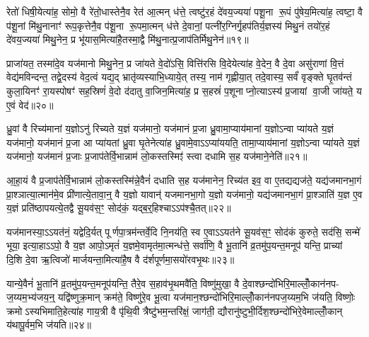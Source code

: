 रेतो॑ धिषी॒येत्या॑ह॒ सोमो॒ वै रे॑तो॒धास्तेनै॒व रेत॑ आ॒त्मन् ध॑त्ते॒ त्वष्टु॑र॒हं दे॑वय॒ज्यया॑ पशू॒ना रू॒पं पु॑षेय॒मित्या॑ह॒ त्वष्टा॒ वै प॑शू॒नां मि॑थु॒नानाꣳ॑ रूप॒कृत्तेनै॒व प॑शू॒ना रू॒पमा॒त्मन् ध॑त्ते दे॒वानां॒ पत्नी॑र॒ग्निर्गृ॒हप॑तिर्य॒ज्ञस्य॑ मिथु॒नं तयो॑र॒हं दे॑वय॒ज्यया॑ मिथु॒नेन॒ प्र भू॑यास॒मित्या॑है॒तस्मा॒द्वै मि॑थु॒नात्प्र॒जाप॑तिर्मिथु॒नेन॑॥१९॥

प्राजा॑यत॒ तस्मा॑दे॒व यज॑मानो मिथु॒नेन॒ प्र जा॑यते वे॒दो॑ऽसि॒ वित्ति॑रसि वि॒देयेत्या॑ह वे॒देन॒ वै दे॒वा असु॑राणां वि॒त्तं वेद्य॑मविन्दन्त॒ तद्वे॒दस्य॑ वेद॒त्वं यद्य॒द् भ्रातृ॑व्यस्याभि॒ध्याये॒त् तस्य॒ नाम॑ गृह्णीया॒त् तदे॒वास्य॒ सर्वं॑ वृङ्क्ते घृ॒तव॑न्तं कुला॒यिनꣳ॑ रा॒यस्पोषꣳ॑ सह॒स्रिणं॑ वे॒दो द॑दातु वा॒जिन॒मित्या॑ह॒ प्र स॒हस्रं॑ प॒शूनाप्नो॒त्याऽस्य॑ प्र॒जायां वा॒जी जा॑यते॒ य ए॒वं वेद॑॥२०॥

{}

ध्रु॒वां वै रिच्य॑मानां य॒ज्ञोऽनु॑ रिच्यते य॒ज्ञं यज॑मानो॒ यज॑मानं प्र॒जा ध्रु॒वामा॒प्याय॑मानां य॒ज्ञोऽन्वा प्या॑यते य॒ज्ञं यज॑मानो॒ यज॑मानं प्र॒जा आ प्या॑यतां ध्रु॒वा घृ॒तेनेत्या॑ह ध्रु॒वामे॒वाऽऽप्या॑ययति॒ तामा॒प्याय॑मानां य॒ज्ञोऽन्वा प्या॑यते य॒ज्ञं यज॑मानो॒ यज॑मानं प्र॒जाः प्र॒जाप॑तेर्वि॒भान्नाम॑ लो॒कस्तस्मिꣵ॑ स्त्वा दधामि स॒ह यज॑माने॒नेति॑॥२१॥

आ॒हा॒यं वै प्र॒जाप॑तेर्वि॒भान्नाम॑ लो॒कस्तस्मि॑न्ने॒वैनं॑ दधाति स॒ह यज॑मानेन॒ रिच्य॑त इव॒ वा ए॒तद्यद्यज॑ते॒ यद्य॑जमानभा॒गं प्रा॒श्ञात्या॒त्मान॑मे॒व प्री॑णात्ये॒तावा॒न्॒ वै य॒ज्ञो यावान्॑ यजमानभा॒गो य॒ज्ञो यज॑मानो॒ यद्य॑जमानभा॒गं प्रा॒श्ञाति॑ य॒ज्ञ ए॒व य॒ज्ञं प्रति॑ष्ठापयत्ये॒तद्वै सू॒यव॑स॒ꣳ॒ सोद॑कं॒ यद्ब॒र्॒\mbox{}हिश्चाऽऽप॑श्चै॒तत्॥२२॥

यज॑मानस्या॒ऽऽयत॑नं॒ यद्वेदि॒र्यत् पूर्णपा॒त्रम॑न्तर्वे॒दि नि॒नय॑ति॒ स्व ए॒वाऽऽयत॑ने सू॒यव॑स॒ꣳ॒ सोद॑कं कुरुते॒ सद॑सि॒ सन्मे॑ भूया॒ इत्या॒हाऽऽपो॒ वै य॒ज्ञ आपो॒ऽमृतं॑ य॒ज्ञमे॒वामृत॑मा॒त्मन्ध॑त्ते॒ सर्वा॑णि॒ वै भू॒तानि॑ व्र॒तमु॑प॒यन्त॒मनूप॑ यन्ति॒ प्राच्यां दि॒शि दे॒वा ऋ॒त्विजो॑ मार्जयन्ता॒मित्या॑है॒ष वै द॑र्\mbox{}शपूर्णमा॒सयो॑रवभृ॒थः॥२३॥

यान्ये॒वैनं॑ भू॒तानि॑ व्र॒तमु॑प॒यन्त॒मनूप॑यन्ति॒ तैरे॒व स॒हाव॑भृ॒थमवै॑ति॒ विष्णु॑मुखा॒ वै दे॒वाश्छन्दो॑भिरि॒माल्लोँ॒कान॑नप- ज॒य्यम॒भ्य॑जय॒न्॒ यद्वि॑ष्णुक्र॒मान् क्रम॑ते॒ विष्णु॑रे॒व भू॒त्वा यज॑मान॒श्छन्दो॑भिरि॒माल्लोँ॒कान॑नपज॒य्यम॒भि ज॑यति॒ विष्णोः॒ क्रमोऽस्यभिमाति॒हेत्या॑ह गाय॒त्री वै पृ॑थि॒वी त्रैष्टु॑भम॒न्तरि॑क्षं॒ जाग॑ती॒ द्यौरानु॑ष्टुभी॒र्दिश॒श्छन्दो॑भिरे॒वेमाल्लोँ॒कान् य॑थापू॒र्वम॒भि ज॑यति॥२४॥

